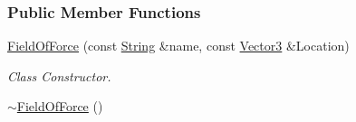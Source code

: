 \subsubsection*{Public Member Functions}
\begin{DoxyCompactItemize}
\item 
\hyperlink{classphys_1_1FieldOfForce_a0e9496af8a6c8cb0d79ebe40bbe223f2}{FieldOfForce} (const \hyperlink{namespacephys_aa03900411993de7fbfec4789bc1d392e}{String} \&name, const \hyperlink{classphys_1_1Vector3}{Vector3} \&Location)
\begin{DoxyCompactList}\small\item\em Class Constructor. \item\end{DoxyCompactList}\item 
\hypertarget{classphys_1_1FieldOfForce_a263efed38a423130a2b3271db6fcbb88}{
\hyperlink{classphys_1_1FieldOfForce_a263efed38a423130a2b3271db6fcbb88}{$\sim$FieldOfForce} ()}
\label{d5/d59/classphys_1_1FieldOfForce_a263efed38a423130a2b3271db6fcbb88}


\end{DoxyCompactItemize}
